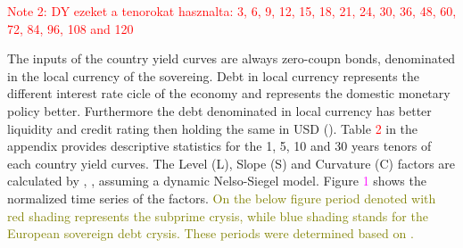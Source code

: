 \documentclass[12pt,bibliography=totoc]{article}
\begin{document}
\textcolor{red}{Note 2: DY ezeket a tenorokat hasznalta: 3, 6, 9, 12, 15, 18, 21, 24, 30, 36, 48, 60, 72, 84, 96, 108 and 120}


The inputs of the country yield curves are always zero-coupn bonds, denominated in the local currency of the sovereing. Debt in local currency represents the different interest rate cicle of the economy and represents the domestic monetary policy better. Furthermore the debt denominated in local currency has better liquidity and credit rating then holding the same in USD  (\cite{sowmya2016linkages}). Table \textcolor{red}{2} in the appendix provides descriptive statistics for the 1, 5, 10 and 30 years tenors of each country yield curves. The Level (L), Slope (S) and Curvature (C) factors are calculated by \cite{diebold2006forecasting}, \cite{diebold2008global}, assuming a dynamic Nelso-Siegel model. Figure \textcolor{magenta}{1} shows the normalized time series of the factors.  \textcolor{olive}{On the below figure period denoted with red shading represents the subprime crysis, while blue shading stands for the European sovereign debt crysis. These periods were determined based on \cite{bostanci2020connected}.}

\end{document}
